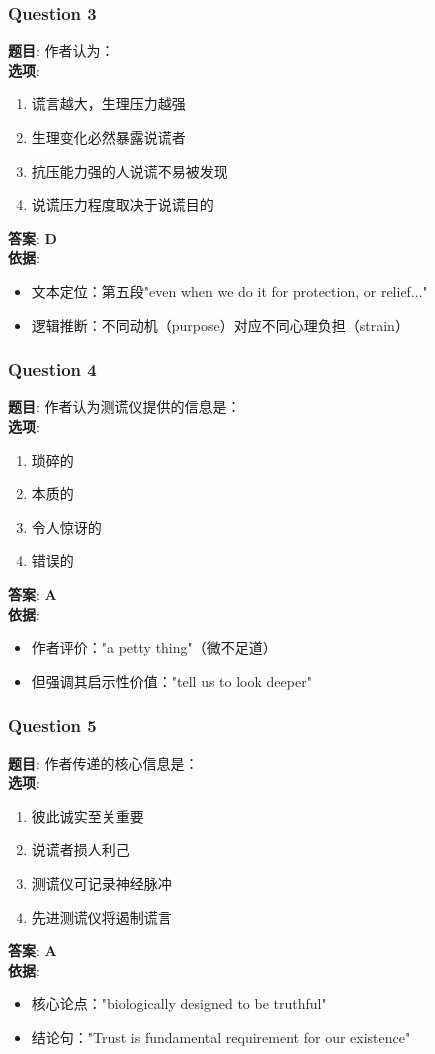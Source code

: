 \documentclass{article}
\begin{document}
\subsubsection*{Question 3}
\textbf{题目}: 作者认为：\\
\textbf{选项}: 
\begin{enumerate}[label=\Alph*)]
    \item 谎言越大，生理压力越强
    \item 生理变化必然暴露说谎者
    \item 抗压能力强的人说谎不易被发现
    \item 说谎压力程度取决于说谎目的
\end{enumerate}
\textbf{答案}: \textbf{D} \\
\textbf{依据}:
\begin{itemize}
    \item 文本定位：第五段"even when we do it for protection, or relief..."
    \item 逻辑推断：不同动机（purpose）对应不同心理负担（strain）
\end{itemize}

\subsubsection*{Question 4}
\textbf{题目}: 作者认为测谎仪提供的信息是：\\
\textbf{选项}: 
\begin{enumerate}[label=\Alph*)]
    \item 琐碎的
    \item 本质的
    \item 令人惊讶的
    \item 错误的
\end{enumerate}
\textbf{答案}: \textbf{A} \\
\textbf{依据}:
\begin{itemize}
    \item 作者评价："a petty thing"（微不足道）
    \item 但强调其启示性价值："tell us to look deeper"
\end{itemize}

\subsubsection*{Question 5}
\textbf{题目}: 作者传递的核心信息是：\\
\textbf{选项}: 
\begin{enumerate}[label=\Alph*)]
    \item 彼此诚实至关重要
    \item 说谎者损人利己
    \item 测谎仪可记录神经脉冲
    \item 先进测谎仪将遏制谎言
\end{enumerate}
\textbf{答案}: \textbf{A} \\
\textbf{依据}:
\begin{itemize}
    \item 核心论点："biologically designed to be truthful"
    \item 结论句："Trust is fundamental requirement for our existence"
\end{itemize}
\end{document}
